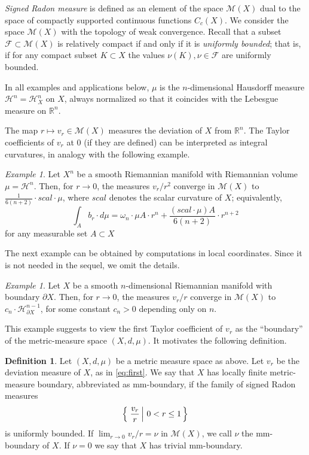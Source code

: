 \documentclass[12pt,leqno,intlimits]{amsart}
\numberwithin{equation}{section}
\theoremstyle{definition}
\newtheorem{defn}[thm]{Definition}%
\theoremstyle{remark}
\newtheorem{ex}[thm]{Example}
\newcommand{\R}{\mathbb{R}}
\newcommand*{\set}[2]{\left\{\,\left.{#1}\vphantom{#2}\,\right|\,{#2}\,\right\}}
\begin{document}
\emph{Signed Radon measure} is defined as an element of the space $\mathcal M(X)$ dual to the space of compactly supported continuous functions $C_c (X)$.
We consider the space $\mathcal M(X)$ with the topology of weak convergence. 
Recall that a subset $\mathcal F \subset \mathcal M(X)$ is relatively compact if and only if 
it is \emph{uniformly bounded};
that is, if for any compact subset $K\subset X$ the values $\nu (K), \nu \in \mathcal F$ are uniformly bounded.

In all examples and applications below, $\mu$ is the $n$-dimensional Hausdorff measure $\mathcal H^n =\mathcal H^n _X$ on $X$, always normalized so that it coincides with the Lebesgue measure on $\R^n$.

The map $r\mapsto v_r \in \mathcal M(X)$ measures the deviation of $X$ from $\R^n$.
The Taylor coefficients of $v_r$ at $0$ (if they are defined) can be interpreted as integral curvatures, in analogy with the following example.

\begin{ex} \label{smoothscal}
Let $X^n$ be a smooth Riemannian manifold with Riemannian volume $\mu =\mathcal H^n$. Then, for $r\to 0$,
the measures $v_r /r^2$ converge in $\mathcal M(X)$ to $\frac 1 {6(n+2)}\cdot scal \cdot \mu$, where
$scal$ denotes the scalar curvature of $X$;
equivalently, 
\[\int_A b_r\cdot d\mu=\omega_n\cdot \mu A\cdot r^n+\frac{(scal\cdot \mu)A}{6(n+2)}\cdot r^{n+2}\]
for any measurable set $A\subset X$
\end{ex}

The next example can be obtained by computations in local coordinates. Since it is not needed in the sequel, we omit
the details.

\begin{ex} \label{mainex}
Let $X$ be a smooth $n$-dimensional Riemannian manifold with boundary $\partial X$.
Then, for $r\to 0$, the measures $v_r/r$ converge in $\mathcal M(X)$ to
$c_n \cdot \mathcal H^{n-1} _{\partial X}$, for some constant $c_n >0$ depending only on $n$.
\end{ex}

This example suggests to view the first Taylor coefficient of $v_r$ as the ``boundary'' of the metric-measure space $(X, d, \mu)$.
It motivates the following definition.

\begin{defn} \label{def:first}
Let $(X,d,\mu)$ be a metric measure space as above. Let $v_r$ be the deviation measure of $X$, as in \eqref{eq:first}.
We say that $X$ has locally finite metric-measure boundary, abbreviated as mm-boundary,
if the family of signed Radon measures
\[\set{\frac { v_r } {r }}{0<r\leq 1}\]
is uniformly bounded.
If $\lim _{r\to 0} v_r /r =\nu $ in $\mathcal M(X)$, we call $\nu$ the mm-boundary of $X$. If $\nu =0$ we say that $X$ has trivial mm-boundary.
\end{defn}
\end{document}
